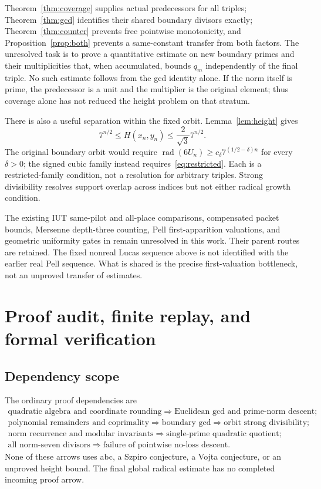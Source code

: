 \documentclass[11pt]{article}
\theoremstyle{definition}
\theoremstyle{remark}
\newcommand{\rad}{\operatorname{rad}}
\begin{document}
Theorem~\ref{thm:coverage} supplies actual predecessors for all triples; Theorem~\ref{thm:gcd} identifies their shared boundary divisors exactly; Theorem~\ref{thm:counter} prevents free pointwise monotonicity, and Proposition~\ref{prop:both} prevents a same-constant transfer from both factors. The unresolved task is to prove a quantitative estimate on new boundary primes and their multiplicities that, when accumulated, bounds $q_m$ independently of the final triple. No such estimate follows from the gcd identity alone. If the norm itself is prime, the predecessor is a unit and the multiplier is the original element; thus coverage alone has not reduced the height problem on that stratum.

There is also a useful separation within the fixed orbit. Lemma~\ref{lem:height} gives
\[
7^{n/2}\le H(x_n,y_n)\le\frac2{\sqrt3}7^{n/2}.
\]
The original boundary orbit would require
$\rad(6U_n)\ge c_\delta7^{(1/2-\delta)n}$ for every $\delta>0$; the signed cubic family instead requires~\eqref{eq:restricted}. Each is a restricted-family condition, not a resolution for arbitrary triples. Strong divisibility resolves support overlap across indices but not either radical growth condition.

The existing IUT same-pilot and all-place comparisons, compensated packet bounds, Mersenne depth-three counting, Pell first-apparition valuations, and geometric uniformity gates in \cite{project} remain unresolved in this work. Their parent routes are retained. The fixed nonreal Lucas sequence above is not identified with the earlier real Pell sequence. What is shared is the precise first-valuation bottleneck, not an unproved transfer of estimates.

\section{Proof audit, finite replay, and formal verification}
\subsection{Dependency scope}
The ordinary proof dependencies are
\[
\begin{array}{c}
\text{quadratic algebra and coordinate rounding}
\Longrightarrow\text{Euclidean gcd and prime-norm descent};\\[2pt]
\text{polynomial remainders and coprimality}
\Longrightarrow\text{boundary gcd}
\Longrightarrow\text{orbit strong divisibility};\\[2pt]
\text{norm recurrence and modular invariants}
\Longrightarrow\text{single-prime quadratic quotient};\\[2pt]
\text{all norm-seven divisors}
\Longrightarrow\text{failure of pointwise no-loss descent}.
\end{array}
\]
None of these arrows uses abc, a Szpiro conjecture, a Vojta conjecture, or an unproved height bound. The final global radical estimate has no completed incoming proof arrow.
\end{document}
